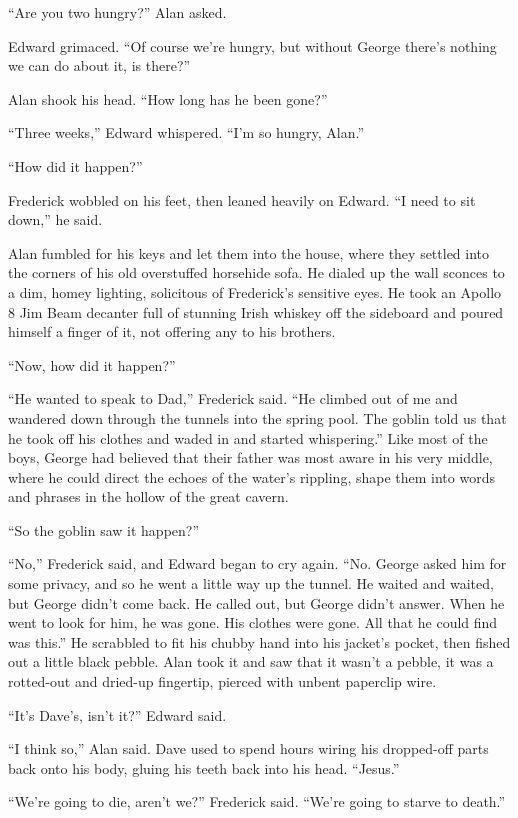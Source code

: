 ``Are you two hungry?'' Alan asked.

Edward grimaced.  ``Of course we're hungry, but without George there's
nothing we can do about it, is there?''

Alan shook his head.  ``How long has he been gone?''

``Three weeks,'' Edward whispered.  ``I'm so hungry, Alan.''

``How did it happen?''

Frederick wobbled on his feet, then leaned heavily on Edward.  ``I
need to sit down,'' he said.

Alan fumbled for his keys and let them into the house, where they
settled into the corners of his old overstuffed horsehide sofa.  He
dialed up the wall sconces to a dim, homey lighting, solicitous of
Frederick's sensitive eyes.  He took an Apollo 8 Jim Beam decanter
full of stunning Irish whiskey off the sideboard and poured himself a
finger of it, not offering any to his brothers.

``Now, how did it happen?''

``He wanted to speak to Dad,'' Frederick said.  ``He climbed out of me
and wandered down through the tunnels into the spring pool.  The
goblin told us that he took off his clothes and waded in and started
whispering.'' Like most of the boys, George had believed that their
father was most aware in his very middle, where he could direct the
echoes of the water's rippling, shape them into words and phrases in
the hollow of the great cavern.

``So the goblin saw it happen?''

``No,'' Frederick said, and Edward began to cry again.  ``No.  George
asked him for some privacy, and so he went a little way up the tunnel. 
He waited and waited, but George didn't come back.  He called out, but
George didn't answer.  When he went to look for him, he was gone.  His
clothes were gone.  All that he could find was this.'' He scrabbled to
fit his chubby hand into his jacket's pocket, then fished out a little
black pebble.  Alan took it and saw that it wasn't a pebble, it was a
rotted-out and dried-up fingertip, pierced with unbent paperclip wire.

``It's Dave's, isn't it?'' Edward said.

``I think so,'' Alan said.  Dave used to spend hours wiring his
dropped-off parts back onto his body, gluing his teeth back into his
head.  ``Jesus.''

``We're going to die, aren't we?'' Frederick said.  ``We're going to
starve to death.''

